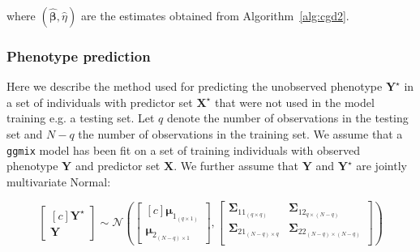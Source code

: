 \documentclass[10pt,letterpaper]{article}
\newcommand{\bX}{\textbf{X}}
\newcommand{\bY}{\textbf{Y}}
\newcommand{\bD}{\textbf{D}}
\newcommand{\bXtilde}{\widetilde{\bX}}
\newcommand{\bYtilde}{\widetilde{\bY}}
\newcommand{\bDtilde}{\widetilde{\bD}}
\newcommand{\bU}{\textbf{U}}
\newcommand{\bV}{\textbf{V}}
\newcommand{\bb}{\textbf{\emph{b}}}
\newcommand{\bSigma}{\boldsymbol{\Sigma}}
\newcommand{\bmu}{\boldsymbol{\mu}}
\newcommand{\bbeta}{\boldsymbol{\beta}}
\newcommand{\bPhi}{\boldsymbol{\Phi}}
\begin{document}
where $(\widehat{\bbeta}, \widehat{\eta})$ are the estimates obtained from Algorithm~\ref{alg:cgd2}.



\subsubsection*{Phenotype prediction} \label{phenoprediction}

Here we describe the method used for predicting the unobserved phenotype $\bY^\star$ in a set of individuals with predictor set $\bX^\star$ that were not used in the model training e.g. a testing set. Let $q$ denote the number of observations in the testing set and $N-q$ the number of observations in the training set. We assume that a \texttt{ggmix} model has been fit on a set of training individuals with observed phenotype $\bY$ and predictor set $\bX$.  We further assume that $\bY$ and $\bY^\star$ are jointly multivariate Normal:

\begin{equation}
\left[ \begin{matrix*}[c]
\bY^\star \\
\bY
\end{matrix*}\right] \sim \mathcal{N} \left( \left[\begin{matrix*}[c]
\bmu_{1_{(q\times 1)}} \\
\bmu_{2_{(N-q)\times 1}}
\end{matrix*}\right], \left[ \begin{matrix}
\bSigma_{11_{(q\times q)}} & \bSigma_{12_{q\times (N-q)}} \\
\bSigma_{21_{(N-q)\times q}} & \bSigma_{22_{(N-q)\times (N-q)}}  \\
\end{matrix}   \right]  \right)
\end{equation}
\end{document}
